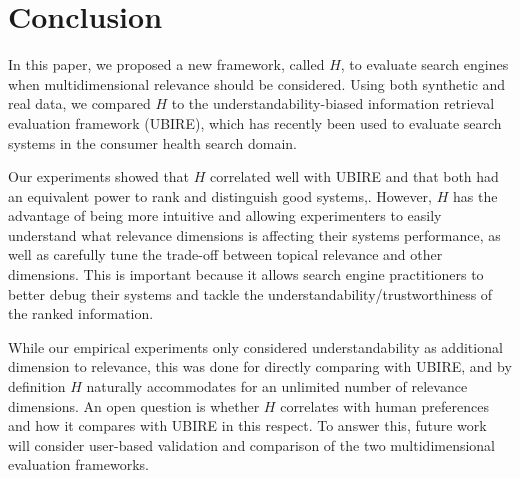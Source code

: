 
\section{Conclusion}
\label{sec:conclusion}

In this paper, we proposed a new framework, called $H$, to evaluate search engines when multidimensional relevance should be considered.
Using both synthetic and real data, we compared $H$ to the understandability-biased information retrieval evaluation framework (UBIRE), which has recently been used  to evaluate search systems in the consumer health search domain. 

Our experiments showed that $H$ correlated well with UBIRE and that both had an equivalent power to rank and distinguish good systems,. However, $H$ has the advantage of being more intuitive and allowing experimenters to easily understand what relevance dimensions is affecting their systems performance, as well as carefully tune the trade-off between topical relevance and other dimensions. This is important because it allows search engine practitioners to better debug their systems and tackle the understandability/trustworthiness of the ranked information.

 While our empirical experiments only considered understandability as additional dimension to relevance, this was done for directly comparing with UBIRE, and by definition $H$ naturally accommodates for an unlimited number of relevance dimensions. An open question is whether $H$ correlates with human preferences and how it compares with UBIRE in this respect. To answer this, future work will consider user-based validation and comparison of the two multidimensional evaluation frameworks. 
